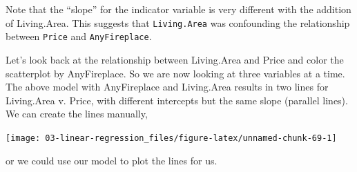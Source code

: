 \documentclass[
]{book}
\newenvironment{Shaded}{\begin{snugshade}}{\end{snugshade}}
\newcommand{\DataTypeTok}[1]{\textcolor[rgb]{0.13,0.29,0.53}{#1}}
\newcommand{\DecValTok}[1]{\textcolor[rgb]{0.00,0.00,0.81}{#1}}
\newcommand{\FloatTok}[1]{\textcolor[rgb]{0.00,0.00,0.81}{#1}}
\newcommand{\KeywordTok}[1]{\textcolor[rgb]{0.13,0.29,0.53}{\textbf{#1}}}
\newcommand{\NormalTok}[1]{#1}
\newcommand{\OperatorTok}[1]{\textcolor[rgb]{0.81,0.36,0.00}{\textbf{#1}}}
\newcommand{\StringTok}[1]{\textcolor[rgb]{0.31,0.60,0.02}{#1}}
\begin{document}
Note that the ``slope'' for the indicator variable is very different with the addition of Living.Area. This suggests that \texttt{Living.Area} was confounding the relationship between \texttt{Price} and \texttt{AnyFireplace}.

Let's look back at the relationship between Living.Area and Price and color the scatterplot by AnyFireplace. So we are now looking at three variables at a time. The above model with AnyFireplace and Living.Area results in two lines for Living.Area v. Price, with different intercepts but the same slope (parallel lines). We can create the lines manually,

\begin{Shaded}
\end{Shaded}

\begin{center}\texttt{[image: 03-linear-regression\_files/figure-latex/unnamed-chunk-69-1]} \end{center}

or we could use our model to plot the lines for us.

\begin{Shaded}
\end{Shaded}
\end{document}

